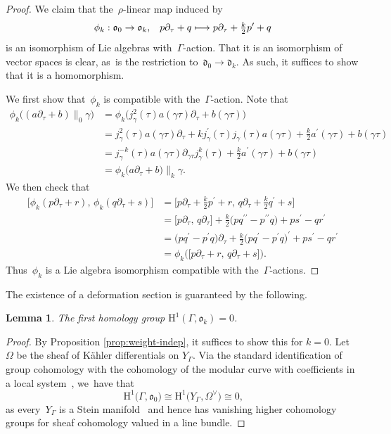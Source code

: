 \documentclass[JEP,XML,SOM,Unicode,published]{cedram}
\newcommand\mto{\mathchoice{\longmapsto}{\mapsto}{\mapsto}{\mapsto}}
\theoremstyle{plain}
\newtheorem{lemma}[theoremcounter]{Lemma}
\theoremstyle{definition}
\newcommand{\tx}{\text}
\newcommand{\nbd}{\nobreakdash-\hspace{0pt}}
\newcommand{\frakd}{\ensuremath{\mathfrak{d}}}
\newcommand{\frako}{\ensuremath{\mathfrak{o}}}
\newcommand{\rmH}{\ensuremath{\mathrm{H}}}
\newcommand{\defcol}{\mathrel{:}}
\let\Ga\Gamma
\let\ga\gamma
\begin{document}
\begin{proof}
We claim that the~$\rho$\nbd{}linear map induced by
\begin{equation*}
\phi_{k}\defcol \frako_0 \to \frako_k
\tx{,}\quad
p\partial_\tau + q \mto p\partial_\tau + \tfrac{k}{2}p^\prime + q
\end{equation*}
is an isomorphism of Lie algebras with~$\Ga$\nbd{}action. That it is an isomorphism of vector spaces is clear, as~is the restriction to~$\frakd_0\to\frakd_k$. As such, it suffices to show that it is a homomorphism.

We first show that~$\phi_k$ is compatible with the~$\Ga$\nbd{}action. Note that
\begin{align*}
\phi_k\bigl((a\partial_\tau+ b)\big\|_0\gamma \bigr)
&= \phi_k\bigl(j_\ga^2(\tau)a(\gamma\tau)\partial_\tau+b(\ga\tau)\bigr) \\
&= j_\ga^2(\tau)a(\ga\tau)\partial_\tau + kj^\prime_\ga(\tau)j_\ga(\tau)a(\ga\tau) + \tfrac{k}{2}a^\prime(\ga\tau)+b(\ga\tau) \\
&= j_\ga^{-k}(\tau)a(\ga\tau)\partial_{\ga\tau} j_\ga^k(\tau) + \tfrac{k}{2}a^\prime(\ga\tau)+b(\ga\tau)\\
&= \phi_k\bigl(a\partial_\tau+ b\bigr)\big\|_k\gamma.
\end{align*}
We then check that
\begin{align*}
\big[ \phi_k(p\partial_\tau + r),\, \phi_k(q\partial_\tau + s) \big]
&= \big[ p\partial_\tau + \tfrac{k}{2}p^\prime + r,\, q\partial_\tau + \tfrac{k}{2}q^\prime + s \big] \\
&= \big[ p\partial_\tau,\, q\partial_\tau \big]
+ \tfrac{k}{2} \bigl(pq^{\prime\prime} -p^{\prime\prime}q\bigr) + ps^\prime - qr^\prime\\
&= \bigl(pq^\prime - p^\prime q\bigr)\partial_\tau
+ \tfrac{k}{2} \bigl(p q^\prime - p^\prime q \bigr)^\prime + ps^\prime - qr^\prime \\
&= \phi_k\bigl(\big[ p\partial_\tau+ r,\, q\partial_\tau+ s \big]\bigr)
\tx{.}
\end{align*}
Thus~$\phi_k$ is a Lie algebra isomorphism compatible with the~$\Ga$\nbd{}actions.
\end{proof}

The existence of a deformation section is guaranteed by the following.

\begin{lemma}\label{lem:vanishing}
The first homology group $\rmH^1(\Ga,\frako_k)=0$.
\end{lemma}
\begin{proof}
By Proposition \ref{prop:weight-indep}, it suffices to show this for $k=0$. Let $\Omega$ be the sheaf of Kähler differentials on $Y_\Ga$. Via the standard identification of group cohomology with the cohomology of the modular curve with coefficients in a local system~\cite{eilenberg45}, we~have that
\begin{equation*}
\rmH^1\bigl(\Ga,\frako_0\bigr)
\cong
\rmH^1\bigl(Y_\Ga, \Omega^{\vee}\bigr) \cong 0
\tx{,}
\end{equation*}
as every~$Y_\Ga$ is a Stein manifold~\cite{behnke47} and hence has vanishing higher cohomology groups for sheaf cohomology valued in a line bundle.
\end{proof}
\end{document}
